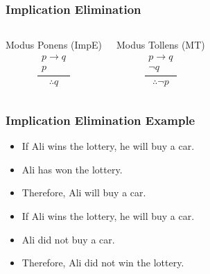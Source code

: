 \documentclass[dvipsnames]{beamer}
\begin{document}
\begin{frame}
  \frametitle{Implication Elimination}

  \begin{columns}[t]
    \begin{block}{Modus Ponens (ImpE)}
      \[
      \frac
        {
          \begin{array}{c}
            p \rightarrow q\\
            p
          \end{array}
        }
        {
          \therefore q
        }
      \]
    \end{block}

    \pause
    \begin{block}{Modus Tollens (MT)}
      \[
      \frac
        {
          \begin{array}{c}
            p \rightarrow q\\
            \neg q
          \end{array}
        }
        {
          \therefore \neg p
        }
      \]
    \end{block}
  \end{columns}
\end{frame}

\begin{frame}
  \frametitle{Implication Elimination Example}

  \begin{example}
    \begin{itemize}
      \item If Ali wins the lottery, he will buy a car.
      \item Ali has won the lottery.

      \medskip
      \item Therefore, Ali will buy a car.
    \end{itemize}
  \end{example}

  \pause
  \begin{example}
    \begin{itemize}
      \item If Ali wins the lottery, he will buy a car.
      \item Ali did not buy a car.

      \medskip
      \item Therefore, Ali did not win the lottery.
    \end{itemize}
  \end{example}
\end{frame}
\end{document}
